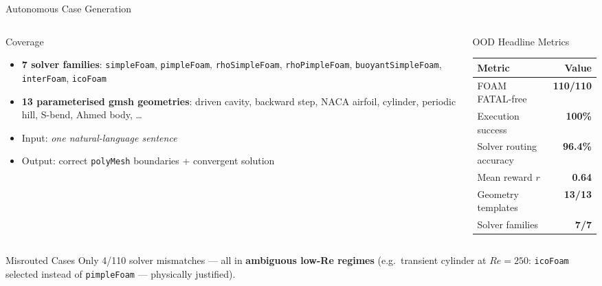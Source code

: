 \documentclass[aspectratio=169,10pt]{beamer}
\begin{document}
\begin{frame}{Autonomous Case Generation}
  \begin{columns}
    \begin{column}{0.50\textwidth}
      \begin{block}{Coverage}
        \begin{itemize}
          \item \textbf{7 solver families}: \texttt{simpleFoam}, \texttt{pimpleFoam}, \texttt{rhoSimpleFoam}, \texttt{rhoPimpleFoam}, \texttt{buoyantSimpleFoam}, \texttt{interFoam}, \texttt{icoFoam}
          \item \textbf{13 parameterised gmsh geometries}: driven cavity, backward step, NACA airfoil, cylinder, periodic hill, S-bend, Ahmed body, …
          \item Input: \textit{one natural-language sentence}
          \item Output: correct \texttt{polyMesh} boundaries + convergent solution
        \end{itemize}
      \end{block}
    \end{column}
    \begin{column}{0.47\textwidth}
      \begin{exampleblock}{OOD Headline Metrics}
        \centering
        \begin{tabular}{lr}
          \toprule
          \textbf{Metric} & \textbf{Value} \\
          \midrule
          FOAM FATAL-free & \textbf{110/110} \\
          Execution success & \textbf{100\%} \\
          Solver routing accuracy & \textbf{96.4\%} \\
          Mean reward $r$ & \textbf{0.64} \\
          Geometry templates & \textbf{13/13} \\
          Solver families & \textbf{7/7} \\
          \bottomrule
        \end{tabular}
      \end{exampleblock}
    \end{column}
  \end{columns}
  \vspace{4pt}
  \begin{alertblock}{Misrouted Cases}
    \small Only 4/110 solver mismatches — all in \textbf{ambiguous low-Re regimes}
    (e.g.\ transient cylinder at $Re=250$: \texttt{icoFoam} selected instead of \texttt{pimpleFoam} — physically justified).
  \end{alertblock}
\end{frame}
\end{document}
